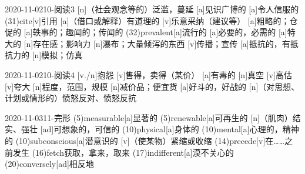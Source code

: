 \documentclass[12pt]{ctexart}
\begin{document}
\begin{wordlist}{2020-11-02}{10-阅读3}
  [n]{（社会观念等的）泛滥，蔓延}
  [a]{见识广博的}
  [a]{令人信服的}
  \word(31){cite}[v]{引用}
  [a]{（借口或解释）有道理的}
  [v]{乐意采纳（建议等）}
  [a]{粗略的；仓促的}
  [a]{轶事的；趣闻的；传闻的}
  \word(32){prevalent}[a]{流行的}
  [a]{必要的，必需的}
  [a]{特大的}
  [n]{存在感；影响力}
  [n]{瀑布；大量倾泻的东西}
  [v]{传播；宣传}
  [a]{抵抗的，有抵抗力的}
  [n]{模拟；仿真}
\end{wordlist}

\begin{wordlist}{2020-11-02}{10-阅读4}
  [v./n]{抱怨}
  [v]{售得，卖得（某价）}
  [a]{有毒的}
  [n]{真空}
  [v]{高估}
  [v]{夸大}
  [n]{程度，范围，规模}
  [n]{减价品；便宜货}
  [a]{好斗的，好战的}
  [n]{（对思想、计划或情形的）愤怒反对、愤怒反抗}
\end{wordlist}

\begin{wordlist}{2020-11-03}{11-完形}
  \word(5){measurable}[a]{显著的}
  \word(5){renewable}[a]{可再生的}
  [n]{（肌肉）结实、强壮}
  [ad]{可想象的，可信的}
  \word(10){physical}[a]{身体的}
  \word(10){mental}[a]{心理的，精神的}
  \word(10){subconscious}[a]{潜意识的}
  [v]{（使某物）紧缩或收缩}
  \word(14){precede}[v]{在……之前发生}
  \word(16){fetch}{获取，拿来，取来}
  \word(17){indifferent}[a]{漠不关心的}
  \word(20){conversely}[ad]{相反地}
\end{wordlist}
\end{document}
